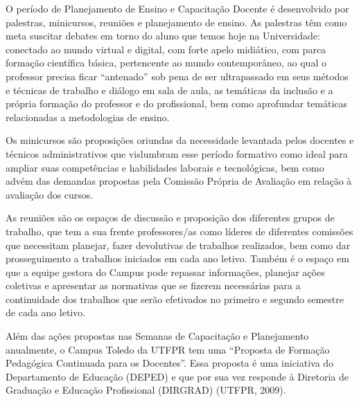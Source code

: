 O período de Planejamento de Ensino e Capacitação Docente é desenvolvido por palestras, minicursos, reuniões e planejamento de ensino. As palestras têm como meta suscitar debates em torno do aluno que temos hoje na Universidade: conectado ao mundo virtual e digital, com forte apelo midiático, com parca formação científica básica, pertencente ao mundo contemporâneo, ao qual o professor precisa ficar ``antenado'' sob pena de ser ultrapassado em seus métodos e técnicas de trabalho e diálogo em sala de aula, as temáticas da inclusão e a própria formação do professor e do profissional, bem como aprofundar temáticas relacionadas a metodologias de ensino.

Os minicursos são proposições oriundas da necessidade levantada pelos docentes e técnicos administrativos que vislumbram esse período formativo como ideal para ampliar suas competências e habilidades laborais e tecnológicas, bem como advém das demandas propostas pela Comissão Própria de Avaliação em relação à avaliação dos cursos.

As reuniões são os espaços de discussão e proposição dos diferentes grupos de trabalho, que tem a sua frente professores/as como líderes de diferentes comissões que necessitam planejar, fazer devolutivas de trabalhos realizados, bem como dar prosseguimento a trabalhos iniciados em cada ano letivo. Também é o espaço em que a equipe gestora do Campus pode repassar informações, planejar ações coletivas e apresentar as normativas que se fizerem necessárias para a continuidade dos trabalhos que serão efetivados no primeiro e segundo semestre de cada ano letivo.

Além das ações propostas nas Semanas de Capacitação e Planejamento anualmente, o Campus Toledo da UTFPR tem uma ``Proposta de Formação Pedagógica Continuada para os Docentes''. Essa proposta é uma iniciativa do Departamento de Educação (DEPED) e que por sua vez responde à Diretoria de Graduação e Educação Profissional (DIRGRAD) (UTFPR, 2009).